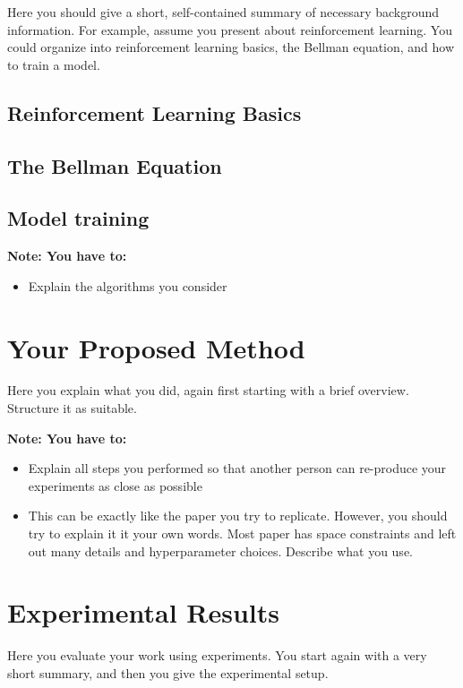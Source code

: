 \documentclass{article}
\begin{document}
Here you should give a short, self-contained summary of necessary
background information. For example, assume you present about reinforcement learning. You could organize into reinforcement learning basics, the Bellman equation, and how to train a model.

\subsection{Reinforcement Learning Basics}

\subsection{The Bellman Equation}

\subsection{Model training}

{\bf Note: You have to:}
\begin{itemize}
\item Explain the algorithms you consider
\end{itemize}


\section{Your Proposed Method}\label{sec:yourmethod}

Here you explain what you did, again first starting with a brief overview.
Structure it as suitable. 

{\bf Note: You have to:}
\begin{itemize}
\item Explain all steps you performed so that another person can re-produce your experiments as close as possible
\item This can be exactly like the paper you try to replicate. However, you should try to explain it it your own words. Most paper has space constraints and left out many details and hyperparameter choices. Describe what you use.
\end{itemize}


\section{Experimental Results}
\label{sec:exp}

Here you evaluate your work using experiments.  You start again with a very short summary, and then you
give the experimental setup. 
\end{document}
